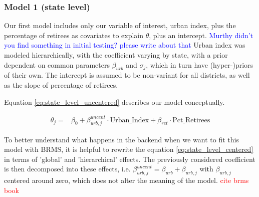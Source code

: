 \documentclass[12pt]{article}
\newcommand{\blue}[1]{\textcolor{blue}{#1}}
\begin{document}
%
%
%
%






\subsubsection*{Model 1 (state level)}


Our first model includes only our variable of interest, urban index, plus the percentage of retirees as covariates to explain $\theta$, plus an intercept.
\blue{ Murthy didn't you find something in initial testing? please write about that}
Urban index was modeled hierarchically, with the coefficient varying by state, with a prior dependent on common parameters $\beta_{urb}$ and $\sigma_{j}$, which in turn have (hyper-)priors of their own. The intercept is assumed to be non-variant for all districts, as well as the slope of percentage of retirees.

Equation \ref{eq:state_level_uncentered} describes our model conceptually.


\begin{equation} \label{eq:state_level_uncentered}
	\begin{aligned}
		\theta_{j} =    &\beta_0 + \beta_{urb,j}^{uncent} \cdot \text{Urban\_Index} + \beta_{ret} \cdot \text{Pct\_Retirees}
	\end{aligned}
\end{equation}

To better understand what happens in the backend when we want to fit this model with BRMS, it is helpful to rewrite the equation \ref{eq:state_level_centered} in terms of 'global' and 'hierarchical' effects. The previously considered coefficient is then decomposed into these effects, i.e.
$\beta_{urb,j}^{uncent} = \beta_{urb} + \beta_{urb,j}$
with $\beta_{urb,j}$ centered around zero, which does not alter the meaning of the model. \textcolor{red}{cite brms book}
\end{document}

